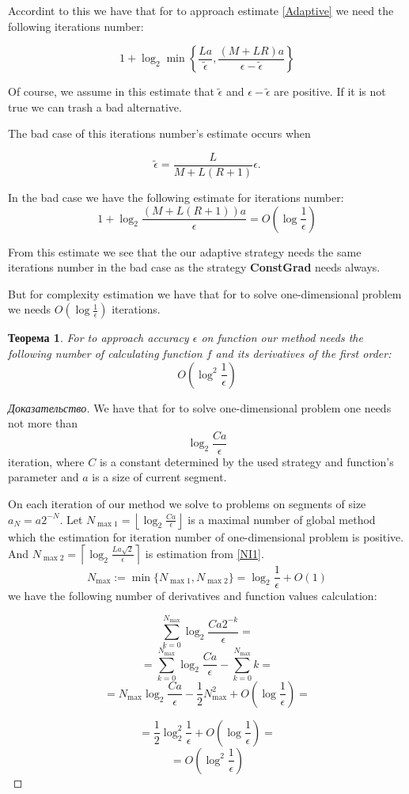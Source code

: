 \documentclass[12pt]{article}
\newtheorem{theorem}{Теорема}[section]
\begin{document}
Accordint to this we have that for to approach estimate \ref{Adaptive} we need the following iterations number:

$$1+\log_2\min\left\{\frac{La}{\tilde{\epsilon}},\frac{(M+LR)a}{\epsilon-\tilde{\epsilon}}\right\}$$

Of course, we assume in this estimate that $\tilde{\epsilon}$ and $\epsilon-\tilde{\epsilon}$ are positive. If it is not true we can trash a bad alternative.

The bad case of this iterations number's estimate occurs when

$$\tilde{\epsilon} = \frac{L}{M+L(R+1)}\epsilon.$$

In the bad case we have the following estimate for iterations number:
$$1+\log_2\frac{(M+L(R+1))a}{\epsilon} = O\left(\log\frac{1}{\epsilon}\right)$$

From this estimate we see that the our adaptive strategy needs the same iterations number in the bad case as the strategy \textbf{ConstGrad} needs always.

But for complexity estimation we have that for to solve one-dimensional problem we needs $O\left(\log \frac{1}{\epsilon}\right)$ iterations.

\begin{theorem}
For to approach accuracy $\epsilon$ on function our method needs the following number of calculating function $f$ and its derivatives of the first order:
$$O\left(\log^2\frac{1}{\epsilon}\right)$$
\end{theorem} 
\begin{proof}[Доказательство]
We have that for to solve one-dimensional problem one needs not more than
$$\log_2\frac{Ca}{\epsilon}$$
iteration, where $C$ is a constant determined by the used strategy and function's parameter and $a$ is a size of current segment.

On each iteration of our method we solve to problems on segments of size $a_N=a2^{-N}$. Let $N_{\max1}=\left\lfloor\log_2\frac{Ca}{\epsilon}\right\rfloor$ is a maximal number of global method which the estimation for iteration number of one-dimensional problem is positive. And $N_{\max2}=\left\lceil\log_2\frac{La\sqrt{2}}{\epsilon}\right\rceil$ is estimation from \ref{NI1}. $$N_{\max}:=\min\{N_{\max1},N_{\max2}\}=\log_2\frac{1}{\epsilon}+O(1)$$ we have the following number of derivatives and function values calculation:

$$\sum_{k=0}^{N_{\max}}\log_2\frac{Ca2^{-k}}{\epsilon} = $$
$$= \sum_{k=0}^{N_{\max}}\log_2\frac{Ca}{\epsilon} - \sum_{k=0}^{N_{\max}}k=$$
$$= N_{\max}\log_2\frac{Ca}{\epsilon} - \frac{1}{2}N_{\max}^2 + O\left(\log\frac{1}{\epsilon}\right)=$$

$$= \frac{1}{2}\log_2^2\frac{1}{\epsilon} +O\left(\log\frac{1}{\epsilon}\right)=$$
$$=O\left(\log^2\frac{1}{\epsilon}\right)$$
\end{proof}
\end{document}
